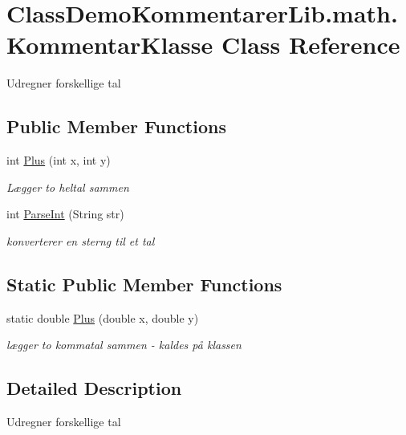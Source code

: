 \hypertarget{class_class_demo_kommentarer_lib_1_1math_1_1_kommentar_klasse}{}\section{Class\+Demo\+Kommentarer\+Lib.\+math.\+Kommentar\+Klasse Class Reference}
\label{class_class_demo_kommentarer_lib_1_1math_1_1_kommentar_klasse}


Udregner forskellige tal  


\subsection*{Public Member Functions}
\begin{DoxyCompactItemize}
\item 
int \mbox{\hyperlink{class_class_demo_kommentarer_lib_1_1math_1_1_kommentar_klasse_abaeb015e9202262a6566682de68f291e}{Plus}} (int x, int y)
\begin{DoxyCompactList}\small\item\em Lægger to heltal sammen \end{DoxyCompactList}\item 
int \mbox{\hyperlink{class_class_demo_kommentarer_lib_1_1math_1_1_kommentar_klasse_af0f5b84b9d2d6fb50e9040fdcc5f58fd}{Parse\+Int}} (String str)
\begin{DoxyCompactList}\small\item\em konverterer en sterng til et tal \end{DoxyCompactList}\end{DoxyCompactItemize}
\subsection*{Static Public Member Functions}
\begin{DoxyCompactItemize}
\item 
static double \mbox{\hyperlink{class_class_demo_kommentarer_lib_1_1math_1_1_kommentar_klasse_a0195f515fd2db15c72c908f938ac7060}{Plus}} (double x, double y)
\begin{DoxyCompactList}\small\item\em lægger to kommatal sammen -\/ kaldes på klassen \end{DoxyCompactList}\end{DoxyCompactItemize}


\subsection{Detailed Description}
Udregner forskellige tal 



